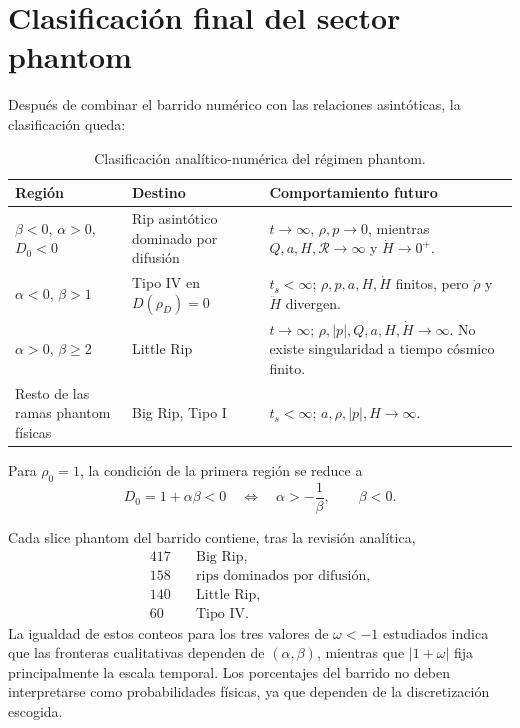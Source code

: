 \documentclass[11pt,a4paper]{article}
\newcommand{\R}{\mathcal{R}}
\begin{document}
\section{Clasificación final del sector phantom}

Después de combinar el barrido numérico con las relaciones asintóticas,
la clasificación queda:

\begin{table}[ht]
\centering
\small
\begin{tabular}{p{4.0cm} p{3.0cm} p{6.0cm}}
\toprule
\textbf{Región} & \textbf{Destino} & \textbf{Comportamiento futuro}\\
\midrule
$\beta<0$, $\alpha>0$, $D_0<0$
&
Rip asintótico dominado por difusión
&
$t\to\infty$, $\rho,p\to0$, mientras
$Q,a,H,\R\to\infty$ y $\dot H\to0^{+}$.
\\[1mm]

$\alpha<0$, $\beta>1$
&
Tipo IV en $D(\rho_D)=0$
&
$t_s<\infty$; $\rho,p,a,H,\dot H$ finitos,
pero $\dot\rho$ y $\ddot H$ divergen.
\\[1mm]

$\alpha>0$, $\beta\ge2$
&
Little Rip
&
$t\to\infty$; $\rho,|p|,Q,a,H,\dot H\to\infty$.
No existe singularidad a tiempo cósmico finito.
\\[1mm]

Resto de las ramas phantom físicas
&
Big Rip, Tipo I
&
$t_s<\infty$; $a,\rho,|p|,H\to\infty$.
\\
\bottomrule
\end{tabular}
\caption{Clasificación analítico-numérica del régimen phantom.}
\end{table}

Para $\rho_0=1$, la condición de la primera región se reduce a
\begin{equation}
    D_0=1+\alpha\beta<0
    \quad\Longleftrightarrow\quad
    \alpha>-\frac{1}{\beta},
    \qquad \beta<0.
\end{equation}

Cada slice phantom del barrido contiene, tras la revisión analítica,
\begin{align*}
417&\quad \text{Big Rip},\\
158&\quad \text{rips dominados por difusión},\\
140&\quad \text{Little Rip},\\
60&\quad \text{Tipo IV}.
\end{align*}
La igualdad de estos conteos para los tres valores de $\omega<-1$ estudiados
indica que las fronteras cualitativas dependen de $(\alpha,\beta)$, mientras
que $|1+\omega|$ fija principalmente la escala temporal. Los porcentajes
del barrido no deben interpretarse como probabilidades físicas, ya que
dependen de la discretización escogida.
\end{document}
